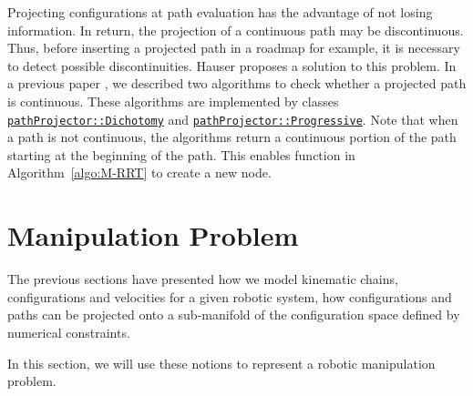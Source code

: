 Projecting configurations at path evaluation has the advantage of not losing information. In return, the projection of a continuous path may be discontinuous. Thus, before inserting a projected path in a roadmap for example, it is necessary to detect possible discontinuities. {\color{blue}Hauser} \cite{Hauser-RSS-13} proposes a solution to this problem. {\color{blue}In a previous paper} \cite{mirabel:hal-01360409}, {\color{blue}we} described two algorithms to check whether a projected path is continuous. These algorithms are implemented by
classes \href{https://gepettoweb.laas.fr/hpp/hpp-core/doxygen-html/classhpp_1_1core_1_1pathProjector_1_1Dichotomy.html}{\texttt{pathProjector::Dichotomy}} and \href{https://gepettoweb.laas.fr/hpp/hpp-core/doxygen-html/classhpp_1_1core_1_1pathProjector_1_1Progressive.html}{\texttt{pathProjector::Progressive}}. {\color{blue} Note that when a path is not continuous, the algorithms return a continuous portion of the path starting at the beginning of the path. This enables function \EXTEND in Algorithm~\ref{algo:M-RRT} to create a new node.}

\section{Manipulation Problem}\label{sec:manipulation-problem}

The previous sections have presented how we model kinematic chains, configurations and velocities for a given robotic system, how configurations and paths can be projected onto a sub-manifold of the configuration space defined by numerical constraints.

In this section, we will use these notions to represent a robotic manipulation problem.

